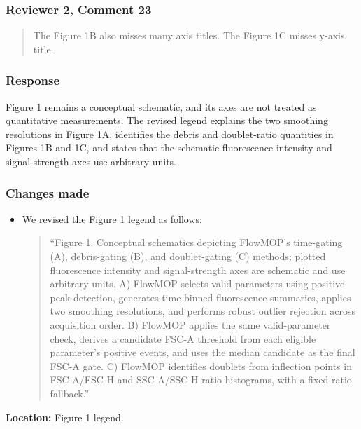 \documentclass[
  11pt,
  a4paper,
]{article}
\begin{document}
\subsubsection{Reviewer 2, Comment 23}\label{reviewer-2-comment-23}

\begin{quote}
The Figure 1B also misses many axis titles. The Figure 1C misses y-axis
title.
\end{quote}

\subsubsection{Response}\label{response-14}

Figure 1 remains a conceptual schematic, and its axes are not treated as
quantitative measurements. The revised legend explains the two smoothing
resolutions in Figure 1A, identifies the debris and doublet-ratio
quantities in Figures 1B and 1C, and states that the schematic
fluorescence-intensity and signal-strength axes use arbitrary units.

\subsubsection{Changes made}\label{changes-made-14}

\begin{itemize}
\item
  We revised the Figure 1 legend as follows:

  \begin{quote}
  ``Figure 1. Conceptual schematics depicting FlowMOP's time-gating (A),
  debris-gating (B), and doublet-gating (C) methods; plotted
  fluorescence intensity and signal-strength axes are schematic and use
  arbitrary units. A) FlowMOP selects valid parameters using
  positive-peak detection, generates time-binned fluorescence summaries,
  applies two smoothing resolutions, and performs robust outlier
  rejection across acquisition order. B) FlowMOP applies the same
  valid-parameter check, derives a candidate FSC-A threshold from each
  eligible parameter's positive events, and uses the median candidate as
  the final FSC-A gate. C) FlowMOP identifies doublets from inflection
  points in FSC-A/FSC-H and SSC-A/SSC-H ratio histograms, with a
  fixed-ratio fallback.''
  \end{quote}
\end{itemize}

\textbf{Location:} Figure 1 legend.
\end{document}
